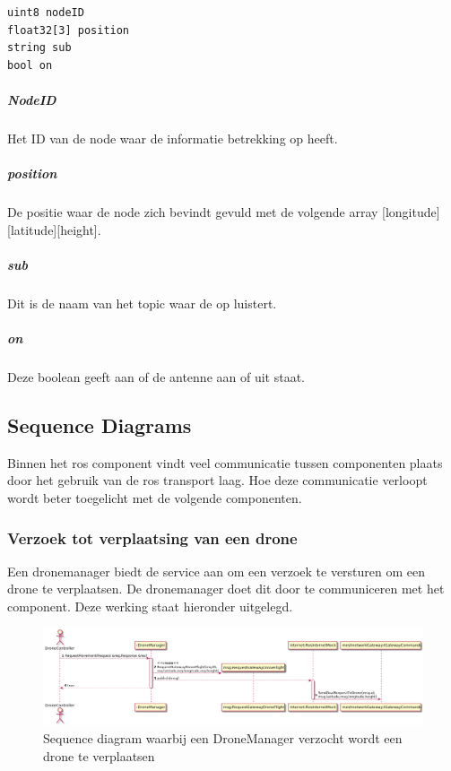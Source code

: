 \documentclass[a4paper, 11pt, oneside]{report}
\begin{document}
\begin{lstlisting}
uint8 nodeID
float32[3] position
string sub
bool on
\end{lstlisting}

\subparagraph{NodeID} Het ID van de node waar de informatie betrekking op heeft.
\subparagraph{position} De positie waar de node zich bevindt gevuld met de volgende array [longitude][latitude][height].
\subparagraph{sub} Dit is de naam van het topic waar de  op luistert.
\subparagraph{on} Deze boolean geeft aan of de antenne aan of uit staat.

\subsection{Sequence Diagrams}
\label{DetailedDesign:ros:sequence}

Binnen het ros component vindt veel communicatie tussen componenten plaats door het gebruik van de ros transport laag.
Hoe deze communicatie verloopt wordt beter toegelicht met de volgende componenten.

\subsubsection{Verzoek tot verplaatsing van een drone}
\label{DetailedDesign:ros:sequence:verplaatsingdrone}

Een dronemanager biedt de service aan om een verzoek te versturen om een drone te verplaatsen. 
De dronemanager doet dit door te communiceren met het  component.
Deze werking staat hieronder uitgelegd.

\begin{figure}[H]
	\begin{center}\includegraphics[width=.95\linewidth]{UML/out/ros/sequence/RequestDroneMovement/RequestDroneMovement.png}\end{center}
	\caption{Sequence diagram waarbij een DroneManager verzocht wordt een drone te verplaatsen}
	\label{fig:ros:sequence:sequence:verplaatsingdrone}
\end{figure}
\end{document}
